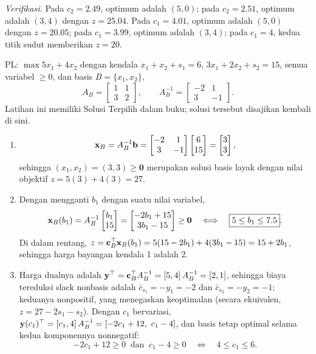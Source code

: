 \emph{Verifikasi.} Pada $c_2 = 2.49$, optimum adalah $(5,0)$; pada $c_2 = 2.51$, optimum adalah $(3,4)$ dengan $z = 25.04$. Pada $c_1 = 4.01$, optimum adalah $(5,0)$ dengan $z = 20.05$; pada $c_1 = 3.99$, optimum adalah $(3,4)$; pada $c_1 = 4$, kedua titik sudut memberikan $z = 20$.


PL: $\max 5x_1 + 4x_2$ dengan kendala $x_1 + x_2 + s_1 = 6$, $3x_1 + 2x_2 + s_2 = 15$, semua variabel $\ge 0$, dan basis $B = \{x_1, x_2\}$,
\[
A_B = \begin{bmatrix} 1 & 1 \\ 3 & 2 \end{bmatrix}, \qquad
A_B^{-1} = \begin{bmatrix} -2 & 1 \\ 3 & -1 \end{bmatrix}.
\]
Latihan ini memiliki Solusi Terpilih dalam buku; solusi tersebut disajikan kembali di sini.

\begin{enumerate}
\item
\[
\mathbf{x}_B = A_B^{-1}\mathbf{b} = \begin{bmatrix} -2 & 1 \\ 3 & -1 \end{bmatrix}\begin{bmatrix} 6 \\ 15 \end{bmatrix} = \begin{bmatrix} 3 \\ 3 \end{bmatrix},
\]
sehingga $(x_1, x_2) = (3, 3) \geq \mathbf{0}$ merupakan solusi basis layak dengan nilai objektif $z = 5(3) + 4(3) = 27$.
\item Dengan mengganti $b_1$ dengan suatu nilai variabel,
\[
\mathbf{x}_B(b_1) = A_B^{-1}\begin{bmatrix} b_1 \\ 15 \end{bmatrix} = \begin{bmatrix} -2b_1 + 15 \\ 3b_1 - 15 \end{bmatrix} \geq \mathbf{0}
\quad\Longleftrightarrow\quad \boxed{5 \le b_1 \le 7.5}.
\]
Di dalam rentang, $z = \mathbf{c}_B^\top \mathbf{x}_B(b_1) = 5(15 - 2b_1) + 4(3b_1 - 15) = 15 + 2b_1$, sehingga harga bayangan kendala 1 adalah $2$.
\item Harga dualnya adalah $\mathbf{y}^\top = \mathbf{c}_B^\top A_B^{-1} = [5, 4]\, A_B^{-1} = [2, 1]$, sehingga biaya tereduksi slack nonbasis adalah $\bar{c}_{s_1} = -y_1 = -2$ dan $\bar{c}_{s_2} = -y_2 = -1$; keduanya nonpositif, yang menegaskan keoptimalan (secara ekuivalen, $z = 27 - 2s_1 - s_2$). Dengan $c_1$ bervariasi, $\mathbf{y}(c_1)^\top = [c_1, 4]\, A_B^{-1} = [-2c_1 + 12,\ c_1 - 4]$, dan basis tetap optimal selama kedua komponennya nonnegatif:
\[
-2c_1 + 12 \ge 0 \ \text{ dan } \ c_1 - 4 \ge 0
\quad\Longleftrightarrow\quad \boxed{4 \le c_1 \le 6}.
\]
\end{enumerate}

